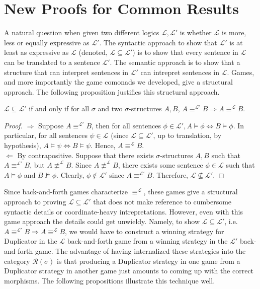 \section{New Proofs for Common Results}
A natural question when given two different logics $\mathcal{L},\mathcal{L'}$ is whether $\mathcal{L}$ is more, less or equally expressive as $\mathcal{L'}$. The syntactic approach to show that $\mathcal{L'}$ is at least as expressive as $\mathcal{L}$ (denoted, $\mathcal{L} \subseteq \mathcal{L'}$) is to show that every sentence in $\mathcal{L}$ can be translated to a sentence $\mathcal{L'}$. The semantic approach is to show that a structure that can interpret sentences in $\mathcal{L'}$ can intrepret sentences in $\mathcal{L}$. Games, and more importantly the game comonads we developed, give a structural approach. The following proposition justifies this structural approach. 
\begin{prop}
$\mathcal{L} \subseteq \mathcal{L'}$ if and only if for all $\sigma$ and two $\sigma$-structures $A,B$, $A \equiv^{\mathcal{L'}} B \Rightarrow A \equiv^{\mathcal{L}} B$.
\label{prop:inclusionToEquiv}
\begin{proof}
$\Rightarrow$ Suppose $A \equiv^{\mathcal{L'}} B$, then for all sentences $\phi \in \mathcal{L'}, A \vDash \phi \Leftrightarrow B \vDash \phi$. In particular, for all sentences $\psi \in \mathcal{L}$ (since $\mathcal{L} \subseteq \mathcal{L'}$, up to translation, by hypothesis), $A \vDash \psi \Leftrightarrow B \vDash \psi$. Hence, $A \equiv^{\mathcal{L}} B$.\\
$\Leftarrow$ By contrapositive. Suppose that there exists $\sigma$-structures $A,B$ such that $A \equiv^{\mathcal{L'}} B$, but $A \not \equiv^{\mathcal{L}} B$. Since $A \not \equiv^{\mathcal{L}} B$, there exists some sentence $\phi \in \mathcal{L}$ such that $A \vDash \phi$ and $B \not\vDash \phi$. Clearly, $\phi \not\in \mathcal{L'}$ since $A \equiv^{\mathcal{L'}} B$. Therefore, $\mathcal{L} \not\subseteq \mathcal{L'}$.
\end{proof}
\end{prop}
Since back-and-forth games characterize $\equiv^{\mathcal{L}}$, these games give a structural approach to proving $\mathcal{L} \subseteq \mathcal{L'}$ that does not make reference to cumbersome syntactic details or coordinate-heavy intrepretations. However, even with this game approach the details could get unwieldy. Namely, to show $\mathcal{L} \subseteq \mathcal{L'}$, i.e. $A \equiv^{\mathcal{L'}} B \Rightarrow A \equiv^{\mathcal{L}} B$, we would have to construct a winning strategy for Duplicator in the $\mathcal{L}$ back-and-forth game from a winning strategy in the $\mathcal{L'}$ back-and-forth game. The advantage of having internalized these strategies into the category $\mathcal{R}(\sigma)$ is that producing a Duplicator strategy in one game from a Duplicator strategy in another game just amounts to coming up with the correct morphisms. The following propositions illustrate this technique well. \\~\\
